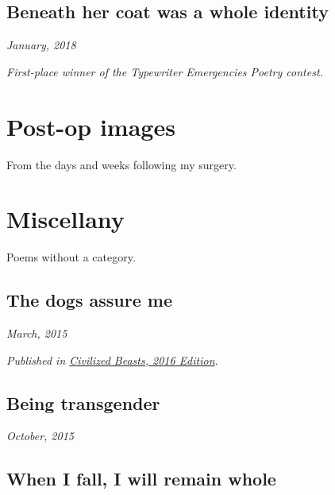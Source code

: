 \documentclass[10pt]{memoir}
\begin{document}
  
  \newpage


  \section{Beneath her coat was a whole identity}

  \hfill\textit{January, 2018}

  

  \textit{First-place winner of the Typewriter Emergencies Poetry contest.}
  \newpage


  \chapter{Post-op images}

  From the days and weeks following my surgery.
  \thispagestyle{empty}
  \newpage

  


  \chapter{Miscellany}

  Poems without a category.
  \thispagestyle{empty}
  \newpage


  \section{The dogs assure me}

  \hfill\textit{March, 2015}

  

  \textit{Published in \underline{Civilized Beasts, 2016 Edition}.}
  \cleartoverso


  \section{Being transgender}

  \hfill\textit{October, 2015}

  
  \newpage


  \section{When I fall, I will remain whole}
\end{document}
